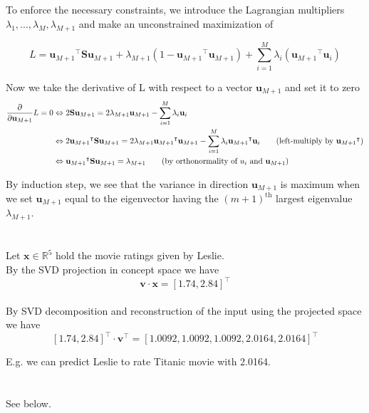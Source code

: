 \documentclass[11pt]{article}
\newcommand{\exercise}{\section{}}
\newcommand{\sumf}[3]{\sum_{#1}^{#2} #3}
\newcommand{\tf}[1]{{#1}^{\intercal}}
\newcommand{\partialf}[1]{\frac{\partial}{{\partial #1}}}
\begin{document}
\exercise

To enforce the necessary constraints, we introduce the Lagrangian multipliers $\lambda_{1}, ..., \lambda_{M}, \lambda_{M+1}$ and make an unconstrained maximization of 

$$L = \tf{\mathbf{u}_{M+1}} \mathbf{S} \mathbf{u}_{M+1}  + \lambda_{M+1}(1 - \tf{\mathbf{u}_{M+1}} \mathbf{u}_{M+1}) + \sumf{i=1}{M}{\lambda_i (\tf{\mathbf{u}_{M+1}} \mathbf{u}_{i} )}$$

\noindent Now we take the derivative of L with respect to a vector $\mathbf{u}_{M+1}$ and set it to zero
\begin{align*}
\partialf{\mathbf{u}_{M+1}} L = 0 &\Leftrightarrow 2 \mathbf{S} \mathbf{u}_{M+1} = 2 \lambda_{M+1} \mathbf{u}_{M+1} - \sumf{i=1}{M}{\lambda_i \mathbf{u}_{i}} \\
&\Leftrightarrow 2 \tf{\mathbf{u}_{M+1}} \mathbf{S} \mathbf{u}_{M+1} = 2 \lambda_{M+1} \tf{\mathbf{u}_{M+1}} \mathbf{u}_{M+1} - \sumf{i=1}{M}{\lambda_i \tf{\mathbf{u}_{M+1}} \mathbf{u}_{i}} \tag{left-multiply by $\tf{\mathbf{u}_{M+1}}$} \\
&\Leftrightarrow \tf{\mathbf{u}_{M+1}} \mathbf{S} \mathbf{u}_{M+1} = \lambda_{M+1} \tag{by orthonormality of $u_i$ and $\mathbf{u}_{M+1}$} \\
\end{align*}

\noindent  By induction step, we see that the variance in direction $\mathbf{u}_{M+1}$  is maximum when we set $\mathbf{u}_{M+1}$ equal to the eigenvector having the $(m+1)^{\text{th}}$ largest eigenvalue $\lambda_{M+1}$.

\exercise

\exercise

Let $\mathbf{x} \in \mathbb{R}^5$ hold the movie ratings given by Leslie.
\\
\noindent By the SVD projection in concept space we have
$$\mathbf{v}  \cdot \mathbf{x} = \tf{[1.74, 2.84]}$$
\\
\noindent By SVD decomposition and reconstruction of the input using the projected space we have
$$ \tf{[1.74, 2.84]} \cdot \tf{\mathbf{v}} = \tf{[1.0092, 1.0092, 1.0092, 2.0164, 2.0164]} $$

\noindent E.g. we can predict Leslie to rate Titanic movie with 2.0164.

\exercise

See below.
\end{document}
